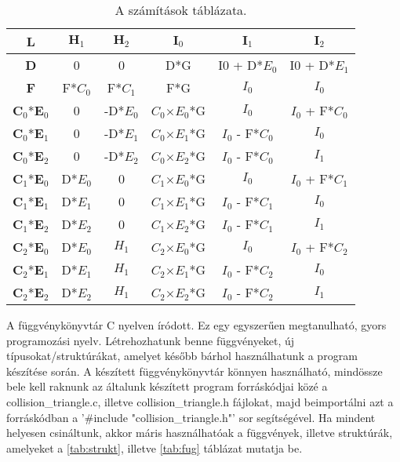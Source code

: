 \begin{table}
	\centering
	
	\begin{tabular}{|c||c|c|c|c|c|}
		\hline
		\textbf{L}     & $\textbf{H}_1$   & $\textbf{H}_2$    & $\textbf{I}_0$      & $\textbf{I}_1$        & $\textbf{I}_2$        \\ \hline
		\textbf{D}     & 0    & 0     & D*G     & I0 + D*$E_0$ & I0 + D*$E_1$ \\ \hline
		\textbf{F}     & F*$C_0$ & F*$C_1$  & F*G     & $I_0$        & $I_0$        \\ \hline
		$\textbf{C}_0$*$\textbf{E}_0$ & 0    & -D*$E_0$ & $C_0$$\times$$E_0$*G & $I_0$        & $I_0$ + F*$C_0$ \\ \hline
		$\textbf{C}_0$*$\textbf{E}_1$ & 0    & -D*$E_1$ & $C_0$$\times$$E_1$*G & $I_0$ - F*$C_0$ & $I_0$        \\ \hline
		$\textbf{C}_0$*$\textbf{E}_2$ & 0    & -D*$E_2$ & $C_0$$\times$$E_2$*G & $I_0$ - F*$C_0$ & $I_1$        \\ \hline
		$\textbf{C}_1$*$\textbf{E}_0$ & D*$E_0$ & 0     & $C_1$$\times$$E_0$*G & $I_0$        & $I_0$ + F*$C_1$ \\ \hline
		$\textbf{C}_1$*$\textbf{E}_1$ & D*$E_1$ & 0     & $C_1$$\times$$E_1$*G & $I_0$ - F*$C_1$ & $I_0$        \\ \hline
		$\textbf{C}_1$*$\textbf{E}_2$ & D*$E_2$ & 0     & $C_1$$\times$$E_2$*G & $I_0$ - F*$C_1$ & $I_1$        \\ \hline
		$\textbf{C}_2$*$\textbf{E}_0$ & D*$E_0$ & $H_1$    & $C_2$$\times$$E_0$*G & $I_0$        & $I_0$ + F*$C_2$ \\ \hline
		$\textbf{C}_2$*$\textbf{E}_1$ & D*$E_1$ & $H_1$    & $C_2$$\times$$E_1$*G & $I_0$ - F*$C_2$ & $I_0$        \\ \hline
		$\textbf{C}_2$*$\textbf{E}_2$ & D*$E_2$ & $H_1$   & $C_2$$\times$$E_2$*G & $I_0$ - F*$C_2$ & $I_1$        \\ \hline
	\end{tabular}
	\caption{A számítások táblázata.}
	\label{tab:szamitas}
\end{table}

\newpage

A függvénykönyvtár C\cite{C} nyelven íródott. Ez egy egyszerűen megtanulható, gyors programozási nyelv. Létrehozhatunk benne függvényeket, új típusokat/struktúrákat, amelyet később bárhol használhatunk a program készítése során. A készített függvénykönyvtár könnyen használható, mindössze bele kell raknunk az általunk készített program forráskódjai közé a collision\_triangle.c, illetve collision\_triangle.h fájlokat, majd beimportálni azt a forráskódban a '\#include "collision\_triangle.h"' sor segítségével. Ha mindent helyesen csináltunk, akkor máris használhatóak a függvények, illetve struktúrák, amelyeket a \ref{tab:strukt}, illetve \ref{tab:fug} táblázat mutatja be.


